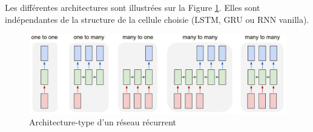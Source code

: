 \noindent Les différentes architectures sont illustrées sur la Figure \ref{archirec}. Elles sont indépendantes de la structure de la cellule choisie (LSTM, GRU ou RNN vanilla).
\begin{figure}
    \centering
    \includegraphics[scale=0.3]{./tex/recurrent-neural-network/archirec.jpg}
    \caption{Architecture-type d'un réseau récurrent}
    \label{archirec}
\end{figure}
